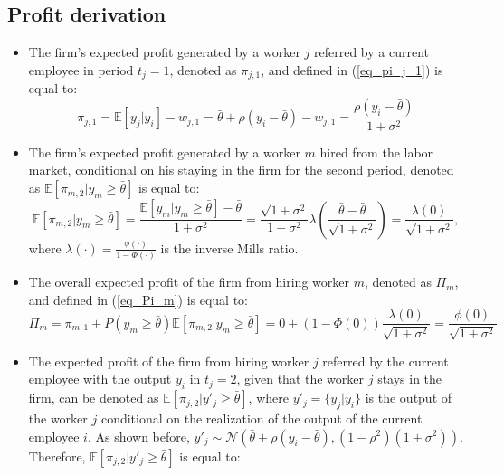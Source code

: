 \documentclass[12pt]{article}
\begin{document}
\subsection*{Profit derivation}
\begin{itemize}
    \item The firm's expected profit generated by a worker $j$ referred by a current employee in period $t_j = 1$, denoted as $\pi_{j,1}$, and defined in (\ref{eq_pi_j_1}) is equal to:
    \begin{equation*}
        \pi_{j,1} = \mathbb{E}[y_j | y_i] - w_{j,1} = \bar{\theta} + \rho (y_i - \bar{\theta}) - w_{j,1} = \frac{\rho (y_i - \bar{\theta})}{1+\sigma^2}
    \end{equation*}
    \item The firm's expected profit generated by a worker $m$ hired from the labor market, conditional on his staying in the firm for the second period, denoted as $\mathbb{E}[\pi_{m,2} | y_m \geq \bar{\theta}]$ is equal to: %
    \begin{equation*}
        \mathbb{E}[\pi_{m,2} | y_m \geq \bar{\theta}] = \frac{\mathbb{E}[y_m | y_m \geq \bar{\theta}] - \bar{\theta}} {1+\sigma^2} = \frac{\sqrt{1+\sigma^2}}{1+\sigma^2}\lambda\left(\frac{\bar{\theta}-\bar{\theta}}{\sqrt{1+\sigma^2}}\right) = \frac{\lambda(0)}{\sqrt{1+\sigma^2}},
    \end{equation*}
    where $\lambda(\cdot) = \frac{\phi(\cdot)}{1-\Phi(\cdot)}$ is the inverse Mills ratio.
    \item The overall expected profit of the firm from hiring worker $m$, denoted as $
    \Pi_m$, and defined in (\ref{eq_Pi_m}) is equal to:
    \begin{equation}\label{eq_profit_m}
        \Pi_m = \pi_{m,1}+P(y_m \geq \bar{\theta})\mathbb{E}\left[\pi_{m,2}|y_m \geq \bar{\theta}\right] 
        = 0 + \left( 1- \Phi \left( 0 \right) \right) \frac{\lambda(0)}{\sqrt{1+\sigma^2}}
        = \frac{\phi(0)}{\sqrt{1+\sigma^2}}
    \end{equation}
    \item The expected profit of the firm from hiring worker $j$ referred by the current employee with the output $y_i$ in $t_j = 2$, given that the worker $j$ stays in the firm, can be denoted as $\mathbb{E}[\pi_{j,2}| y'_j \geq \bar{\theta}]$, where $y'_j = \lbrace y_j | y_i \rbrace$ is the output of the worker $j$ conditional on the realization of the output of the current employee $i$. As shown before, $y'_j \sim \mathcal{N}\left( \bar{\theta}+ \rho(y_i-\bar{\theta}), (1-\rho^2)(1+\sigma^2)\right)$. Therefore, $\mathbb{E}[\pi_{j,2}| y'_j \geq \bar{\theta}]$ is equal to:

\end{itemize}
\end{document}
